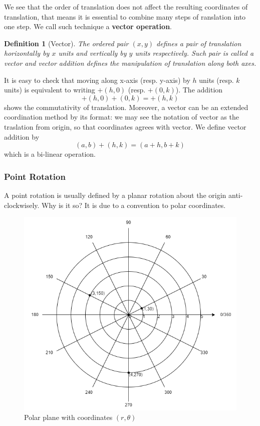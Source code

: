 \documentclass[12pt]{article}
\newtheorem{definition}{Definition}[section]
\begin{document}
    We see that the order of translation does not affect the resulting coordinates of translation, that means it is essential to combine many steps of ranslation into one step. We call such technique a \textbf{vector operation}.
    
    \begin{definition}[Vector]
        The ordered pair $(x,y)$ defines a pair of translation horizontally by $x$ units and vertically by $y$ units respectively. Such pair is called a vector and vector addition defines the manipulation of translation along both axes.
    \end{definition}

    It is easy to check that moving along x-axis (resp. y-axis) by $h$ units (resp. $k$ units) is equivalent to writing $+(h,0)$ (resp. $+(0,k)$). The addition \[+(h,0)+(0,k)=+(h,k)\] shows the commutativity of translation. Moreover, a vector can be an extended coordination method by its format: we may see the notation of vector as the traslation from origin, so that coordinates agrees with vector. We define vector addition by \[(a,b)+(h,k)=(a+h,b+k)\] which is a bi-linear operation.

    \subsubsection*{Point Rotation}

    A point rotation is usually defined by a planar rotation about the origin anti-clockwisely. Why is it so? It is due to a convention to polar coordinates.

    \begin{figure}[H]
        \centering
        \includegraphics[scale=0.8]{polar.png}
        \caption{Polar plane with coordinates $(r,\theta)$}
    \end{figure}
\end{document}
